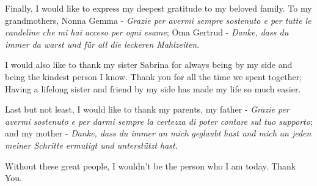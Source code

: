 \documentclass[twoside,openright]{scrreprt}
\begin{document}
Finally, I would like to express my deepest gratitude to my beloved family. To my grandmothers, Nonna Gemma - \emph{Grazie per avermi sempre sostenuto e per tutte le candeline che mi hai acceso per ogni esame}; Oma Gertrud - \emph{Danke, dass du immer da warst und für all die leckeren Mahlzeiten}.

I would also like to thank my sister Sabrina for always being by my side and being the kindest person I know. Thank you for all the time we spent together; Having a lifelong sister and friend by my side has made my life so much easier.

Last but not least, I would like to thank my parents, my father - \emph{Grazie per avermi sostenuto e per darmi sempre la certezza di poter contare sul tuo supporto}; and my mother - \emph{Danke, dass du immer an mich geglaubt hast und mich an jeden meiner Schritte ermutigt und unterstützt hast}.

Without these great people, I wouldn't be the person who I am today. Thank You.




\cleardoublepage

\tableofcontents
{}

\listoffigures

\listoftables























\printbibliography
%
\end{document}
